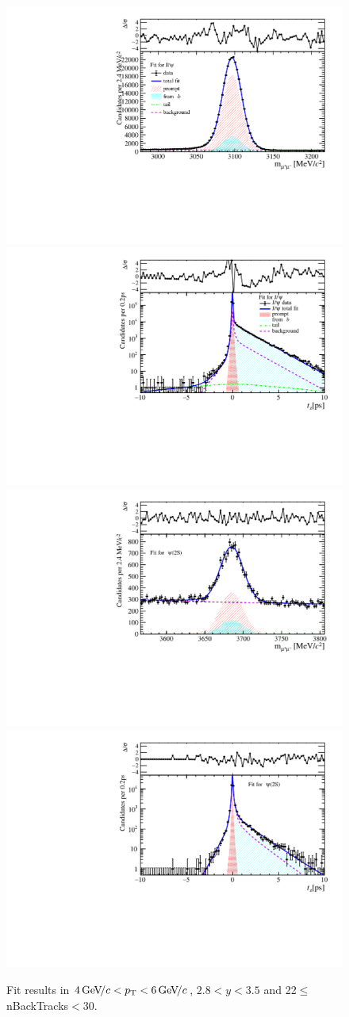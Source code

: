 \begin{figure}[H]
\begin{center}
\includegraphics[width=0.47\linewidth]{pdf/Jpsi/drawmassB/n4y2pt3.pdf}
\includegraphics[width=0.47\linewidth]{pdf/Jpsi/2DFitB/n4y2pt3.pdf}
\vspace*{-0.5cm}
\includegraphics[width=0.47\linewidth]{pdf/Psi2S/drawmassB/n4y2pt3.pdf}
\includegraphics[width=0.47\linewidth]{pdf/Psi2S/2DFitB/n4y2pt3.pdf}
\vspace*{-0.5cm}
\end{center}
\caption{Fit results in $4\text{\,Ge\kern -0.1em V\!/}c<p_{\mathrm{T}}<6\text{\,Ge\kern -0.1em V\!/}c$, $2.8<y<3.5$ and 22$\leq$nBackTracks$<$30.}
\label{Fitn4y2pt3}
\end{figure}
